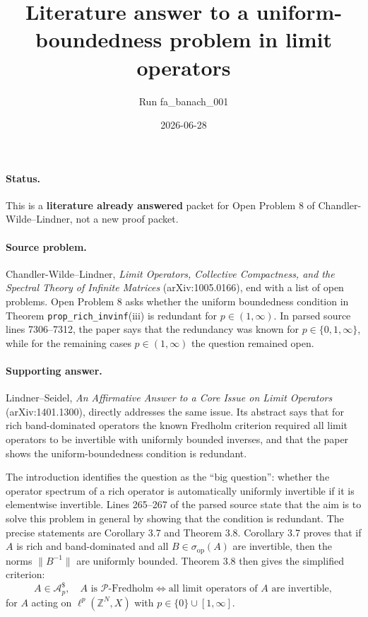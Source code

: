 \documentclass[11pt]{article}
\title{Literature answer to a uniform-boundedness problem in limit operators}
\author{Run fa\_banach\_001}
\date{2026-06-28}
\begin{document}
\maketitle
\sloppy

\paragraph{Status.}
This is a \textbf{literature already answered} packet for Open Problem 8 of
Chandler-Wilde--Lindner, not a new proof packet.

\paragraph{Source problem.}
Chandler-Wilde--Lindner, \emph{Limit Operators, Collective Compactness, and the
Spectral Theory of Infinite Matrices} (arXiv:1005.0166), end with a list of
open problems.  Open Problem 8 asks whether the uniform boundedness condition
in Theorem \texttt{prop\_rich\_invinf}(iii) is redundant for
\(p\in(1,\infty)\).  In parsed source lines 7306--7312, the paper says that
the redundancy was known for \(p\in\{0,1,\infty\}\), while for the remaining
cases \(p\in(1,\infty)\) the question remained open.

\paragraph{Supporting answer.}
Lindner--Seidel, \emph{An Affirmative Answer to a Core Issue on Limit Operators}
(arXiv:1401.1300), directly addresses the same issue.  Its abstract says that
for rich band-dominated operators the known Fredholm criterion required all
limit operators to be invertible with uniformly bounded inverses, and that the
paper shows the uniform-boundedness condition is redundant.

The introduction identifies the question as the ``big question'': whether the
operator spectrum of a rich operator is automatically uniformly invertible if
it is elementwise invertible.  Lines 265--267 of the parsed source state that
the aim is to solve this problem in general by showing that the condition is
redundant.  The precise statements are Corollary 3.7 and Theorem 3.8.  Corollary
3.7 proves that if \(A\) is rich and band-dominated and all
\(B\in\sigma_{\mathrm{op}}(A)\) are invertible, then the norms
\(\|B^{-1}\|\) are uniformly bounded.  Theorem 3.8 then gives the simplified
criterion:
\[
  A\in\mathcal A_p^\$, \quad
  A \text{ is } \mathcal P\text{-Fredholm}
  \iff
  \text{all limit operators of } A \text{ are invertible},
\]
for \(A\) acting on \(\ell^p(\mathbb Z^N,X)\) with
\(p\in\{0\}\cup[1,\infty]\).
\end{document}
